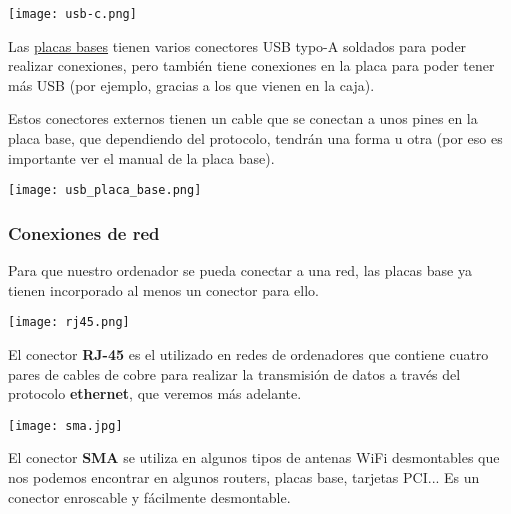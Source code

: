 \vspace{-15pt}
\begin{center}
    \texttt{[image: usb-c.png]}
    \vspace{-10pt}
\end{center}

Las \hyperlink{placa_base}{placas bases} tienen varios conectores USB typo-A soldados para poder realizar conexiones, pero también tiene conexiones en la placa para poder tener más USB (por ejemplo, gracias a los que vienen en la caja).

Estos conectores externos tienen un cable que se conectan a unos pines en la placa base, que dependiendo del protocolo, tendrán una forma u otra (por eso es importante ver el manual de la placa base).

\vspace{-10pt}
\begin{center}
    \texttt{[image: usb\_placa\_base.png]}
\end{center}


\subsubsection{Conexiones de red}

Para que nuestro ordenador se pueda conectar a una red, las placas base ya tienen incorporado al menos un conector para ello.

\begin{minipage}{0.15\linewidth}
    \texttt{[image: rj45.png]}
\end{minipage}
\hfill
\begin{minipage}{0.8\linewidth}
    El conector \textbf{RJ-45} es el utilizado en redes de ordenadores que contiene cuatro pares de cables de cobre para realizar la transmisión de datos a través del protocolo \textbf{ethernet}, que veremos más adelante.
\end{minipage}


\vspace{12pt}
\begin{minipage}{0.15\linewidth}
    \texttt{[image: sma.jpg]}
\end{minipage}
\hfill
\begin{minipage}{0.8\linewidth}
    El conector \textbf{SMA} se utiliza en algunos tipos de antenas WiFi desmontables que nos podemos encontrar en algunos routers, placas base, tarjetas PCI... Es un conector enroscable y fácilmente desmontable.
\end{minipage}


